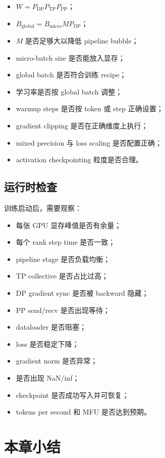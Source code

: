 \begin{itemize}
\item $W=P_{\mathrm{DP}}P_{\mathrm{TP}}P_{\mathrm{PP}}$；
\item $B_{\mathrm{global}}=B_{\mathrm{micro}}MP_{\mathrm{DP}}$；
\item $M$ 是否足够大以降低 pipeline bubble；
\item micro-batch size 是否能放入显存；
\item global batch 是否符合训练 recipe；
\item 学习率是否按 global batch 调整；
\item warmup steps 是否按 token 或 step 正确设置；
\item gradient clipping 是否在正确维度上执行；
\item mixed precision 与 loss scaling 是否配置正确；
\item activation checkpointing 粒度是否合理。
\end{itemize}

\subsection{运行时检查}
\label{subsec:runtime-checklist}

训练启动后，需要观察：

\begin{itemize}
\item 每张 GPU 显存峰值是否有余量；
\item 每个 rank step time 是否一致；
\item pipeline stage 是否负载均衡；
\item TP collective 是否占比过高；
\item DP gradient sync 是否被 backward 隐藏；
\item PP send/recv 是否出现等待；
\item dataloader 是否阻塞；
\item loss 是否稳定下降；
\item gradient norm 是否异常；
\item 是否出现 NaN/inf；
\item checkpoint 是否成功写入并可恢复；
\item tokens per second 和 MFU 是否达到预期。
\end{itemize}

\section{本章小结}
\label{sec:chapter10-summary}

